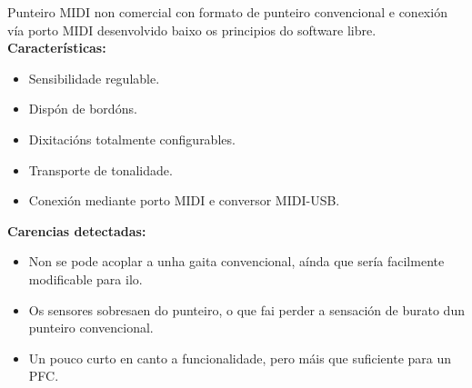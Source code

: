   Punteiro MIDI non comercial con formato de punteiro convencional e conexión
  vía porto MIDI desenvolvido baixo os principios do software libre. \\

  \textbf{Características:}

  \begin{itemize}
   \item Sensibilidade regulable.
   \item Dispón de bordóns.
   \item Dixitacións totalmente configurables.
   \item Transporte de tonalidade.
   \item Conexión mediante porto MIDI e conversor MIDI-USB.
  \end{itemize}

  \textbf{Carencias detectadas:}

  \begin{itemize}
   \item Non se pode acoplar a unha gaita convencional, aínda que sería
         facilmente modificable para ilo.
   \item Os sensores sobresaen do punteiro, o que fai perder a sensación de
         burato dun punteiro convencional.
   \item Un pouco curto en canto a funcionalidade, pero máis que suficiente
         para un PFC.
  \end{itemize}